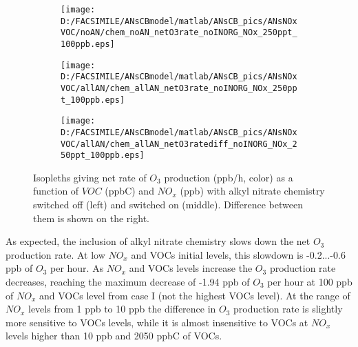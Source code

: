 \documentclass[11pt,a4paper]{article}
\begin{document}
\begin{figure}[h!] %
	\centering
	\begin{subfigure}[t]{0.45\textwidth}
        \centering
        \texttt{[image: D:/FACSIMILE/ANsCBmodel/matlab/ANsCB\_pics/ANsNOxVOC/noAN/chem\_noAN\_netO3rate\_noINORG\_NOx\_250ppt\_100ppb.eps]}
        \caption{}
    \end{subfigure}%
    \hfill
    \begin{subfigure}[t]{0.45\textwidth}
        \centering
        \texttt{[image: D:/FACSIMILE/ANsCBmodel/matlab/ANsCB\_pics/ANsNOxVOC/allAN/chem\_allAN\_netO3rate\_noINORG\_NOx\_250ppt\_100ppb.eps]}
        \caption{}
    \end{subfigure}
    \hfill
    \begin{subfigure}[t]{0.45\textwidth}
        \centering
        \texttt{[image: D:/FACSIMILE/ANsCBmodel/matlab/ANsCB\_pics/ANsNOxVOC/allAN/chem\_allAN\_netO3ratediff\_noINORG\_NOx\_250ppt\_100ppb.eps]}
        \caption{}
    \end{subfigure}%
    \hfill
\caption{Isopleths giving net rate of $O_3$ production (ppb/h, color) as a function of $VOC$ (ppbC) and $NO_x$ (ppb) with alkyl nitrate chemistry switched off (left) and switched on (middle). Difference between them is shown on the right.}\label{fig:netO3rate_noAN_withAN_diff}
\end{figure}

As expected, the inclusion of alkyl nitrate chemistry slows down the net $O_3$ production rate. At low $NO_x$ and VOCs initial levels, this slowdown is -0.2...-0.6 ppb of $O_3$ per hour. As $NO_x$ and VOCs levels increase the $O_3$ production rate decreases, reaching the maximum decrease of -1.94 ppb of $O_3$ per hour at 100 ppb of $NO_x$ and VOCs level from case I (not the highest VOCs level). At the range of $NO_x$ levels from 1 ppb to 10 ppb the difference in $O_3$ production rate is slightly more sensitive to VOCs levels, while it is almost insensitive to VOCs at $NO_x$ levels higher than 10 ppb and 2050 ppbC of VOCs. 
\end{document}
